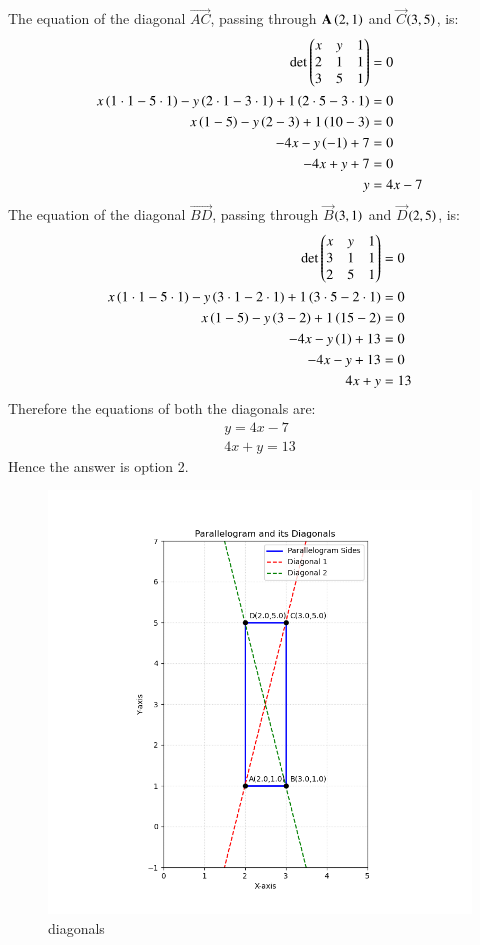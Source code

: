 \documentclass[journal]{IEEEtran}
\theoremstyle{remark}
\begin{document}
The equation of the diagonal $\vec{AC}$, passing through $\mathbf{A}\left(2, 1\right)$ and $\vec{C}$$\left(3, 5\right)$, is:
\begin{align}
    \det \begin{pmatrix} x & y & 1 \\ 2 & 1 & 1 \\ 3 & 5 & 1 \end{pmatrix} &= 0 \\
    x\left(1 \cdot 1 - 5 \cdot 1\right) - y\left(2 \cdot 1 - 3 \cdot 1\right) + 1\left(2 \cdot 5 - 3 \cdot 1\right) &= 0 \\
    x\left(1 - 5\right) - y\left(2 - 3\right) + 1\left(10 - 3\right) &= 0 \\
    -4x - y\left(-1\right) + 7 &= 0 \\
    -4x + y + 7 &= 0 \\
    y &= 4x - 7
\end{align}
The equation of the diagonal $\vec{BD}$, passing through $\vec{B}$$\left(3, 1\right)$ and $\vec{D}$$\left(2, 5\right)$, is:
\begin{align}
    \det \begin{pmatrix} x & y & 1 \\ 3 & 1 & 1 \\ 2 & 5 & 1 \end{pmatrix} &= 0 \\
    x\left(1 \cdot 1 - 5 \cdot 1\right) - y\left(3 \cdot 1 - 2 \cdot 1\right) + 1\left(3 \cdot 5 - 2 \cdot 1\right) &= 0 \\
    x\left(1 - 5\right) - y\left(3 - 2\right) + 1\left(15 - 2\right) &= 0 \\
    -4x - y\left(1\right) + 13 &= 0 \\
    -4x - y + 13 &= 0 \\
    4x + y &= 13
\end{align}
Therefore the equations of both the diagonals are:
\begin{align}
    y=4x-7 \\
    4x+y=13
\end{align}
Hence the answer is option 2.


\begin{figure}[H]
    \centering
    \includegraphics[width=0.9\columnwidth]{figs/diagonals.png}
    \caption{diagonals}
    \label{fig:placeholder_1}
\end{figure}
\end{document}
